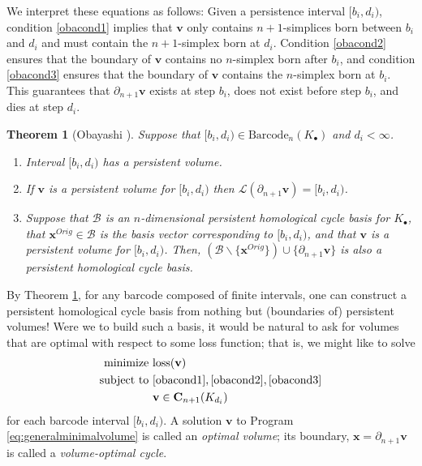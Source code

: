 \documentclass[11pt,onecolumn]{article}
\newtheorem{theorem}{Theorem}[section] %
\newcommand{\Chains}{\mathbf{C}}
\newcommand{\originalrep}{\mathbf{x}^{Orig}}
\newcommand{\optimalrep}{\mathbf{x}}
\newcommand{\volvec}{\mathbf{v}}
\newcommand{\barcode}{\mathrm{Barcode}}
\newcommand{\persinterval}{\mathcal{L}}
\newcommand{\loss}{\mathrm{loss}}
\newcommand{\pr}{Program }
\newcommand{\hcyclebasis}{\mathcal B}
\theoremstyle{plain}
\theoremstyle{definition}
\begin{document}
We interpret these equations as follows: Given a persistence interval $[b_i,d_i)$, condition \eqref{obacond1} implies that $\volvec$ only contains $n+1$-simplices born between $b_i$ and $d_i$ and must contain the $n+1$-simplex born at $d_i$. Condition \eqref{obacond2} ensures that the boundary of $\volvec$ contains no $n$-simplex born after $b_i$, and condition \eqref{obacond3} ensures that the boundary of $\volvec$ contains the $n$-simplex born at $b_i$. This guarantees that $\partial_{n+1}\volvec$ exists at step $b_i$, does not exist before step $b_i$, and dies at step $d_i$.

%
\begin{theorem}[Obayashi \cite{Obayashi2018}]  
\label{thm:obayashi}
Suppose that $[b_i, d_i) \in \barcode_n(K_\bullet)$ and  $d_i < \infty$.
    \begin{enumerate}
        \item Interval $[b_i, d_i)$ has a persistent volume.
        \item If $\volvec$ is a persistent volume for $[b_i, d_i)$ then $\persinterval(\partial_{n+1}\volvec) = [b_i, d_i)$.
        \item Suppose that $\hcyclebasis$ is an $n$-dimensional persistent homological cycle basis for $K_\bullet$, that $\originalrep \in \hcyclebasis$ is the basis vector corresponding to $[b_i, d_i)$, and that $\volvec$ is a persistent volume for $[b_i, d_i)$.  Then, $(\hcyclebasis \backslash \{\originalrep\}) \cup \{\partial_{n+1}\volvec\} $  
        is also a persistent homological cycle basis.
    \end{enumerate}
\end{theorem}

By Theorem \ref{thm:obayashi}, for any barcode composed of finite intervals, one can construct a persistent homological cycle basis from nothing but (boundaries of) persistent volumes!  Were we to build such a basis, it would be natural to ask for volumes that are optimal with respect to some loss function; that is, we might like to solve
\begin{align}
\begin{split}
    \text{minimize } & \loss(\volvec) \\
    \text{subject to } 
    & \eqref{obacond1}, \eqref{obacond2}, \eqref{obacond3}\\
    & \textbf{v} \in \Chains_{n+1}(K_{d_i}) 
\end{split}
\label{eq:generalminimalvolume}
\end{align}
for each barcode interval $[b_i, d_i)$.  A solution $\volvec$ to \pr \eqref{eq:generalminimalvolume} is called an \emph{optimal volume}; its boundary, $\optimalrep=\partial_{n+1}\volvec$ is called a \emph{volume-optimal cycle}.
\end{document}
